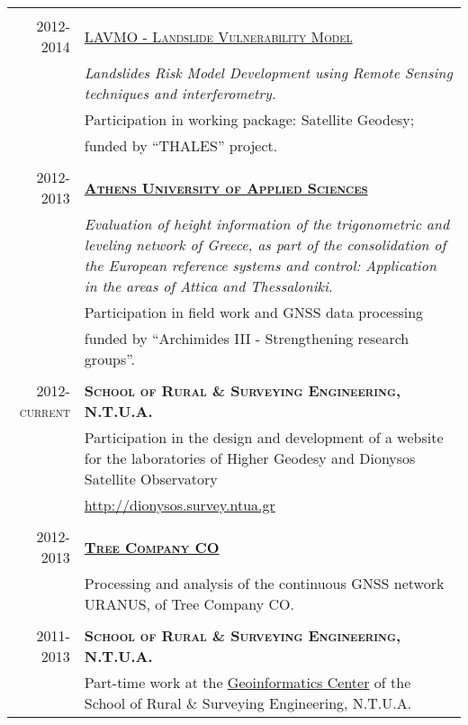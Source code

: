 \documentclass[a4paper,10pt]{article} %
\begin{document}
\begin{longtable}{r|p{13cm}}
\multicolumn{2}{c}{} \\ 
\textsc{2012-2014} & \textsc{\href{http://excellence.minedu.gov.gr/thales/en/thalesprojects/379347}{LAVMO - Landslide Vulnerability Model}}\\
  & \textit{Landslides Risk Model Development using Remote Sensing techniques and interferometry.}\\
  & Participation in working package: Satellite Geodesy;\\
  & funded by \textquotedblleft THALES\textquotedblright{} project.\\

\multicolumn{2}{c}{} \\
\textsc{2012-2013} & \textbf{\textsc{\href{http://www.teiath.gr/?lang=en}{Athens University of Applied Sciences}}}\\
  & \textit{Evaluation of height information of the trigonometric and leveling network of Greece, as part of the consolidation of the European reference systems and control: Application in the areas of Attica and Thessaloniki.}\\
  & Participation in field work and GNSS data processing \\
  & funded by \textquotedblleft Archimides III - Strengthening research groups\textquotedblright{}.\\

\multicolumn{2}{c}{} \\
\textsc{2012-current} & \textbf{\textsc{School of Rural \& Surveying Engineering, N.T.U.A.}}\\
  & Participation in the design and development of a website for the laboratories of Higher Geodesy and Dionysos Satellite Observatory\\
  & \url{http://dionysos.survey.ntua.gr}\\

\multicolumn{2}{c}{} \\
\textsc{2012-2013} & \textbf{\textsc{\href{http://www.treecomp.gr/}{Tree Company CO}}}\\
  & Processing and analysis of the continuous GNSS network URANUS, of Tree Company CO.\\

\multicolumn{2}{c}{} \\
\textsc{2011-2013} & \textbf{\textsc{School of Rural \& Surveying Engineering, N.T.U.A.}}\\
  & Part-time work at the \href{http://portal.survey.ntua.gr/main/geocenter/geocen-g.html}{Geoinformatics Center} of the School of Rural \& Surveying Engineering, N.T.U.A.\\


\end{longtable}
\end{document}
